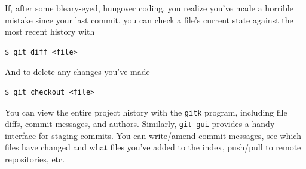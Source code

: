 If, after some bleary-eyed, hungover coding, you realize you've made a horrible mistake since your last commit, you can check a file's current state against the most recent history with
\begin{verbatim}
$ git diff <file>
\end{verbatim}
And to delete any changes you've made
\begin{verbatim}
$ git checkout <file>
\end{verbatim}
You can view the entire project history with the \texttt{gitk} program, including file diffs, commit messages, and authors. Similarly, \texttt{git gui} provides a handy interface for staging commits. You can write/amend commit messages, see which files have changed and what files you've added to the index, push/pull to remote repositories, etc.

